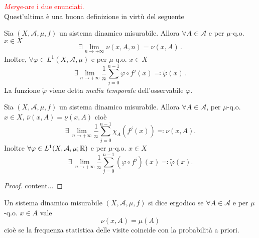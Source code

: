 \textcolor{red}{\emph{Merge}-are i due enunciati.} \\

Quest'ultima è una buona definizione in virtù del seguente

\begin{thm}[Birkhoff]\label{thm:Birkhoff}
    Sia $ (X,\mathcal{A},\mu,f) $ un sistema dinamico misurabile. Allora $ \forall A\in\mathcal{A} $ e per $ \mu $-q.o. $ x\in X $
    \[ \exists \lim_{n \to +\infty} \nu(x,A,n) = \nu(x,A) \, . \]
    Inoltre, $ \forall \varphi \in L^1(X,\mathcal{A},\mu) $ e per $ \mu $-q.o. $ x\in X $
    \[ \exists \lim_{n \to +\infty} \frac{1}{n} \sum_{j=0}^{n-1} \varphi\circ f^j(x) \eqqcolon \tilde{\varphi}(x) \, . \]
    La funzione $ \tilde{\varphi} $ viene detta \emph{media temporale} dell'osservabile $ \varphi $.
\end{thm}

\begin{thm}[Birkoff] \label{thm:Birkoff}
    Sia $ (X, \mathcal{A}, \mu, f) $ un sistema dinamico misurabile. Allora $ \forall A \in \mathcal{A} $, per $ \mu $-q.o. $ x \in X $, $ \overline{\nu}(x, A) = \underline{\nu}(x, A) $ cioè
    \[
    \exists \, \lim_{n \to +\infty} \frac{1}{n} \sum_{j = 0}^{n-1} \chi_A(f^{j}(x)) \eqqcolon \nu(x, A).
    \]
    Inoltre $ \forall \varphi \in L^1(X, \mathcal{A}, \mu; \mathbb{R}) $ e per $ \mu $-q.o. $ x \in X $
    \[
    \exists \, \lim_{n \to +\infty} \frac{1}{n} \sum_{j=0}^{n-1} (\varphi \circ f^j)(x) \eqqcolon \tilde{\varphi}(x).
    \]
\end{thm}
\begin{proof}
    content...
\end{proof}

\begin{definition}
    Un sistema dinamico misurabile $ (X, \mathcal{A}, \mu, f) $ si dice ergodico se $ \forall A \in \mathcal{A} $ e per $ \mu $-q.o. $ x \in A $ vale
    \[
        \nu(x, A) = \mu(A)
    \]
    cioè se la frequenza statistica delle visite coincide con la probabilità a priori. 
\end{definition}

%
%


